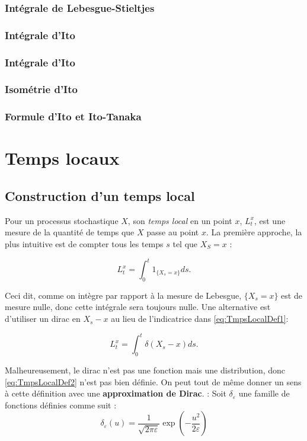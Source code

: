\documentclass[openany]{book}
\theoremstyle{thmfont}
\theoremstyle{deffont}
\theoremstyle{thmfont}
\theoremstyle{deffont}
\begin{document}
\subsection{Intégrale de Lebesgue-Stieltjes}
\subsection{Intégrale d'Ito}
\subsection{Intégrale d'Ito}
\subsection{Isométrie d'Ito}
\subsection{Formule d'Ito et Ito-Tanaka}

\chapter{Temps locaux}
\section{Construction d'un temps local}
Pour un processus stochastique $X$, son \textit{temps local} en un point $x$, $L_t^x$, est une mesure de la quantité de temps que $X$ passe au point $x$. La première approche, la plus intuitive est de compter tous les temps $s$ tel que $X_S = x$ :

\begin{equation}
  \label{eq:TmpsLocalDef1}
   L^x_t= \int_0^t1_{\{X_s=x\}}ds.
  \end{equation}

  Ceci dit, comme on intègre par rapport à la mesure de Lebesgue, $\{X_s = x\}$ est de mesure nulle, donc cette intégrale sera toujours nulle. Une alternative est d'utiliser un dirac en $X_s - x$ au lieu de l'indicatrice dans \eqref{eq:TmpsLocalDef1}:


\begin{equation}
  \label{eq:TmpsLocalDef2}
  L^x_t= \int_0^t\delta(X_s-x)ds.
\end{equation}

Malheureusement, le dirac n'est pas une fonction mais une distribution, donc \eqref{eq:TmpsLocalDef2} n'est pas bien définie. On peut tout de même donner un sens à cette définition avec une \textbf{approximation de Dirac}.  : Soit $\delta_\varepsilon$ une famille de fonctions définies comme suit :
\begin{equation*}
  \delta_\varepsilon(u) = \frac{1}{\sqrt{2\pi \varepsilon}} \exp\left(-\frac{u^2}{2 \varepsilon} \right)
\end{equation*}
\end{document}
